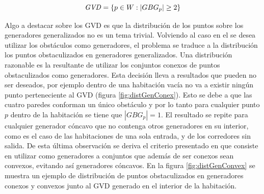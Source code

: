 

\begin{equation}
  \mathit{GVD}  = \{p \in W : |GBG_p| \geq 2\}\label{eq:GVD}
\end{equation}
\vspace{0.1cm}

Algo a destacar sobre los GVD es que la distribución de los puntos sobre los
generadores generalizados no es un tema trivial. Volviendo al caso en el se
desea utilizar los obstáculos como generadores, el problema se traduce a la
distribución los puntos obstaculizados en generadores generalizados. Una
distribución razonable es la resultante de utilizar los conjuntos conexos de
puntos obstaculizados como generadores. Esta decisión lleva a resultados que
pueden no ser deseados, por ejemplo dentro de una habitación vacía no va a
existir ningún punto perteneciente al GVD (figura \ref{fig:distGenConex}). Esto
se debe a que las cuatro paredes conforman un único obstáculo y por lo tanto
para cualquier punto $p$ dentro de la habitación se tiene que $|GBG_p| = 1$.
El resultado se repite para cualquier generador cóncavo que no contenga otros
generadores en su interior, como es el caso de las habitaciones de una sola
entrada, y de los corredores sin salida. De esta última observación se deriva
el criterio presentado en \cite{choset2005principles} que consiste en utilizar
como generadores a conjuntos que además de ser conexos sean convexos, evitando
así generadores cóncavos. En la figura \ref{fig:distGenConvex} se muestra un
ejemplo de distribución de puntos obstaculizados en generadores conexos y
convexos junto al GVD generado en el interior de la habitación. 

